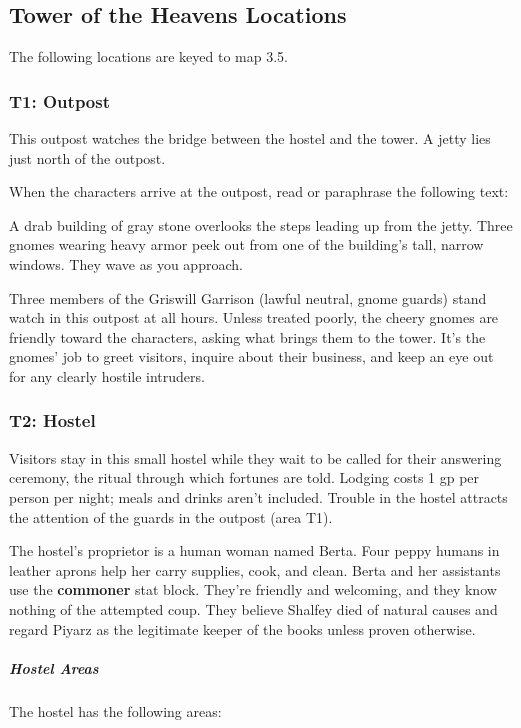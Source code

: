 \documentclass[10pt,a4paper,twoside,bg=print,twocolumn,openany,nodeprecatedcode]{dndbook}
\begin{document}
\subsection{Tower of the Heavens Locations}
The following locations are keyed to map 3.5.

\subsubsection{T1: Outpost}
This outpost watches the bridge between the hostel and the tower. A jetty lies just north of the outpost.

When the characters arrive at the outpost, read or paraphrase the following text:

\begin{DndReadAloud}{}
A drab building of gray stone overlooks the steps leading up from the jetty. Three gnomes wearing heavy armor peek out from one of the building's tall, narrow windows. They wave as you approach.

\end{DndReadAloud}

Three members of the Griswill Garrison (lawful neutral, gnome guards) stand watch in this outpost at all hours. Unless treated poorly, the cheery gnomes are friendly toward the characters, asking what brings them to the tower. It's the gnomes' job to greet visitors, inquire about their business, and keep an eye out for any clearly hostile intruders.

\subsubsection{T2: Hostel}
Visitors stay in this small hostel while they wait to be called for their answering ceremony, the ritual through which fortunes are told. Lodging costs 1 gp per person per night; meals and drinks aren't included. Trouble in the hostel attracts the attention of the guards in the outpost (area T1).

The hostel's proprietor is a human woman named Berta. Four peppy humans in leather aprons help her carry supplies, cook, and clean. Berta and her assistants use the \textbf{commoner} stat block. They're friendly and welcoming, and they know nothing of the attempted coup. They believe Shalfey died of natural causes and regard Piyarz as the legitimate keeper of the books unless proven otherwise.

\subparagraph{Hostel Areas}
The hostel has the following areas:
\end{document}
